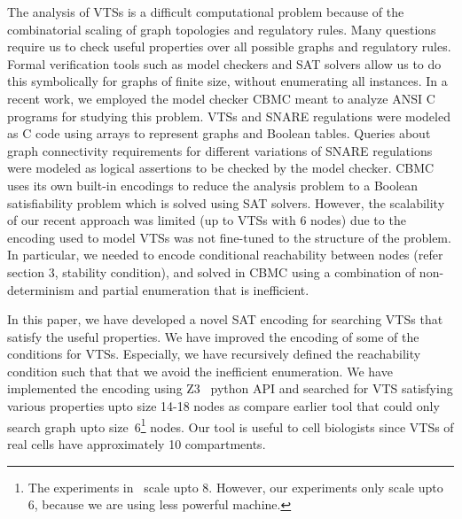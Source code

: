 The analysis of VTSs is a difficult computational problem because of the combinatorial scaling of graph topologies and regulatory rules. Many questions require us to check useful properties over all possible graphs and regulatory rules. Formal verification tools such as model checkers \cite{clarke1996symbolic, biere2003bounded, clarke2008birth, cimatti2000nusmv, holzmann1997model} and SAT solvers \cite{moskewicz2001chaff,een2004extensible} allow us to do this symbolically for graphs of finite size, without enumerating all instances. In a recent work, we employed the model checker CBMC \cite{CKY03, ckl2004} meant to analyze ANSI C programs for studying this problem. VTSs and SNARE regulations were modeled as C code using arrays to represent graphs and Boolean tables. Queries about graph connectivity requirements for different variations of SNARE regulations were modeled as logical assertions to be checked by the model checker. CBMC uses its own built-in encodings to reduce the analysis problem to a Boolean satisfiability problem which is solved using SAT solvers.
%
However, the scalability of our recent approach was limited (up to
VTSs with 6 nodes) due to the encoding used to model VTSs was not
fine-tuned to the structure of the problem.
%
In particular, we needed to encode conditional reachability between
nodes (refer section 3, stability condition), and solved in CBMC using a
combination of non-determinism and partial enumeration that is
inefficient.



In this paper, we have developed a novel SAT encoding for
searching VTSs that satisfy the useful properties.
%
We have improved the encoding of some of the conditions for VTSs.
%
Especially, we have recursively defined the reachability condition
such that that we avoid the inefficient enumeration.
%
%
%
We have implemented the encoding using Z3~\cite{z3} python API and
searched for VTS satisfying various properties upto size 14-18 nodes
as compare earlier tool that could only search graph upto
size~6\footnote{The experiments in~\cite{shukla} scale upto 8.
However, our experiments only scale upto 6, because
we are using less powerful machine.} nodes.
%
Our tool is useful to cell biologists since VTSs of real cells have
approximately 10 compartments.


